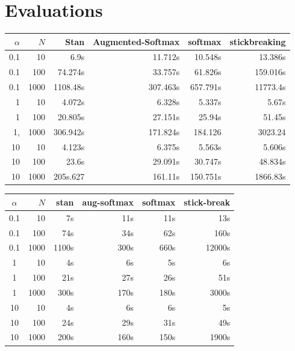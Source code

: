 \documentclass[11pt]{article}
\begin{document}
\section{Evaluations}

\begin{table}[!ht]
    \centering
    \begin{tabular}{r|r|r|r|r|r|}
    \hline
        $\alpha$ & $N$ & Stan & Augmented-Softmax & softmax & stickbreaking \\ \hline
        0.1 & 10  & 6.9s & 11.712s & 10.548s & 13.386s \\ 
        0.1 & 100 & 74.274s & 33.757s & 61.826s & 159.016s \\ 
        0.1 & 1000 & 1108.48s & 307.463s & 657.791s & 11773.4s \\ 
        1 & 10 & 4.072s & 6.328s & 5.337s & 5.67s \\ 
        1 & 100 & 20.805s & 27.151s & 25.94s & 51.45s \\ 
        1, & 1000 & 306.942s & 171.824s & 184.126 & 3023.24 \\ 
        10 & 10 & 4.123s & 6.375s & 5.563s & 5.606s \\ 
        10 & 100 & 23.6s & 29.091s & 30.747s & 48.834s \\ 
        10 & 1000 & 205s.627 & 161.11s & 150.751s & 1866.83s \\ \hline
    \end{tabular}
\end{table}

\begin{table}[!ht]
    \centering
    \begin{tabular}{c|r||r|r|r|r|}
        $\alpha$ & $N$ & stan & aug-softmax & softmax & stick-break \\ \hline 
        0.1 & 10  & 7s & 11s & 11s & 13s \\ 
        0.1 & 100 & 74s & 34s & 62s & 160s \\ 
        0.1 & 1000 & 1100s & 300s & 660s & 12000s \\ 
        1 & 10 & 4s & 6s & 5s & 6s \\ 
        1 & 100 & 21s & 27s & 26s & 51s \\ 
        1 & 1000 & 300s & 170s & 180s & 3000s \\ 
        10 & 10 & 4s & 6s & 6s & 5s \\ 
        10 & 100 & 24s & 29s & 31s & 49s \\ 
        10 & 1000 & 200s & 160s & 150s & 1900s \\
    \end{tabular}
\end{table}
\end{document}
